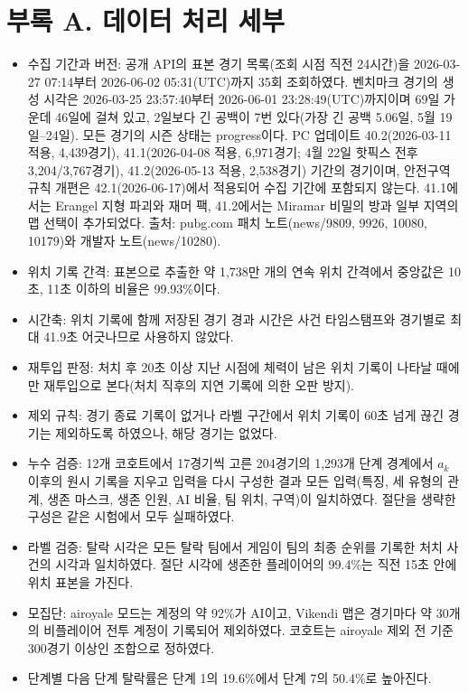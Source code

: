\section*{부록 A. 데이터 처리 세부}
\begin{itemize}
\item 수집 기간과 버전: 공개 API의 표본 경기 목록(조회 시점 직전 24시간)을 2026-03-27 07:14부터 2026-06-02 05:31(UTC)까지 35회 조회하였다. 벤치마크 경기의 생성 시각은 2026-03-25 23:57:40부터 2026-06-01 23:28:49(UTC)까지이며 69일 가운데 46일에 걸쳐 있고, 2일보다 긴 공백이 7번 있다(가장 긴 공백 5.06일, 5월 19일--24일). 모든 경기의 시즌 상태는 progress이다. PC 업데이트 40.2(2026-03-11 적용, 4,439경기), 41.1(2026-04-08 적용, 6,971경기; 4월 22일 핫픽스 전후 3,204/3,767경기), 41.2(2026-05-13 적용, 2,538경기) 기간의 경기이며, 안전구역 규칙 개편은 42.1(2026-06-17)에서 적용되어 수집 기간에 포함되지 않는다. 41.1에서는 Erangel 지형 파괴와 재머 팩, 41.2에서는 Miramar 비밀의 방과 일부 지역의 맵 선택이 추가되었다. 출처: pubg.com 패치 노트(news/9809, 9926, 10080, 10179)와 개발자 노트(news/10280).
\item 위치 기록 간격: 표본으로 추출한 약 1,738만 개의 연속 위치 간격에서 중앙값은 10초, 11초 이하의 비율은 99.93\%이다.
\item 시간축: 위치 기록에 함께 저장된 경기 경과 시간은 사건 타임스탬프와 경기별로 최대 41.9초 어긋나므로 사용하지 않았다.
\item 재투입 판정: 처치 후 20초 이상 지난 시점에 체력이 남은 위치 기록이 나타날 때에만 재투입으로 본다(처치 직후의 지연 기록에 의한 오판 방지).
\item 제외 규칙: 경기 종료 기록이 없거나 라벨 구간에서 위치 기록이 60초 넘게 끊긴 경기는 제외하도록 하였으나, 해당 경기는 없었다.
\item 누수 검증: 12개 코호트에서 17경기씩 고른 204경기의 1,293개 단계 경계에서 $a_k$ 이후의 원시 기록을 지우고 입력을 다시 구성한 결과 모든 입력(특징, 세 유형의 관계, 생존 마스크, 생존 인원, AI 비율, 팀 위치, 구역)이 일치하였다. 절단을 생략한 구성은 같은 시험에서 모두 실패하였다.
\item 라벨 검증: 탈락 시각은 모든 탈락 팀에서 게임이 팀의 최종 순위를 기록한 처치 사건의 시각과 일치하였다. 절단 시각에 생존한 플레이어의 99.4\%는 직전 15초 안에 위치 표본을 가진다.
\item 모집단: airoyale 모드는 계정의 약 92\%가 AI이고, Vikendi 맵은 경기마다 약 30개의 비플레이어 전투 계정이 기록되어 제외하였다. 코호트는 airoyale 제외 전 기준 300경기 이상인 조합으로 정하였다.
\item 단계별 다음 단계 탈락률은 단계 1의 19.6\%에서 단계 7의 50.4\%로 높아진다.
\end{itemize}

